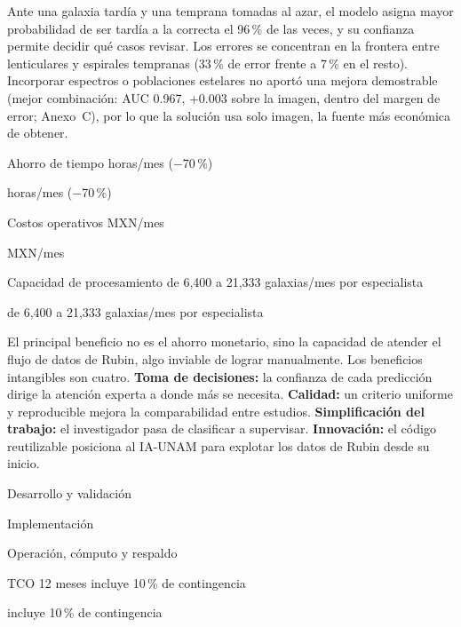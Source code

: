 \documentclass[letterpaper,11pt]{article}
\newcommand{\cifra}[5]{%
  \begingroup\setlength{\fboxsep}{5pt}%
  \colorbox{#1}{\parbox[t]{\dimexpr\linewidth-2\fboxsep\relax}{%
    \setstretch{1}\color{#2}{\Large\bfseries #3}\par
    #4%
    \ifx\relax#5\relax\else\par{\footnotesize #5}\fi}}%
  \endgroup}
\newcommand{\cifragris}[4]{\cifra{black!8}{black}{#1}{#2}{#3}}
\newcommand{\cifraacento}[4]{\cifra{blue!10}{blue!55!black}{#1}{#2}{#3}}
\begin{document}
\noindent Ante una galaxia tardía y una temprana tomadas al azar, el modelo asigna mayor probabilidad de ser tardía a la correcta el 96\,\% de las veces, y su confianza permite decidir qué casos revisar. Los errores se concentran en la frontera entre lenticulares y espirales tempranas (33\,\% de error frente a 7\,\% en el resto). Incorporar espectros o poblaciones estelares no aportó una mejora demostrable (mejor combinación: AUC 0.967, +0.003 sobre la imagen, dentro del margen de error; Anexo~C), por lo que la solución usa solo imagen, la fuente más económica de obtener.

\medskip
\noindent
\begin{minipage}[t]{0.31\linewidth}\cifragris{$-$35\,h}{Ahorro de tiempo}{horas/mes ($-$70\,\%)}{}\end{minipage}\hfill
\begin{minipage}[t]{0.31\linewidth}\cifragris{$-$MXN 8,750}{Costos operativos}{MXN/mes}{}\end{minipage}\hfill
\begin{minipage}[t]{0.31\linewidth}\cifragris{+233\,\%}{Capacidad de procesamiento}{de 6,400 a 21,333 galaxias/mes por especialista}{}\end{minipage}

\smallskip
\noindent{\footnotesize\textcolor{black!60}{Escenario base de 2,000 galaxias/mes y 30\,\% de casos a revisión. Cálculo y supuestos (propios, por confirmar con el IA-UNAM) en el Anexo~A.}}
\medskip

\noindent El principal beneficio no es el ahorro monetario, sino la capacidad de atender el flujo de datos de Rubin, algo inviable de lograr manualmente. Los beneficios intangibles son cuatro. \textbf{Toma de decisiones:} la confianza de cada predicción dirige la atención experta a donde más se necesita. \textbf{Calidad:} un criterio uniforme y reproducible mejora la comparabilidad entre estudios. \textbf{Simplificación del trabajo:} el investigador pasa de clasificar a supervisar. \textbf{Innovación:} el código reutilizable posiciona al IA-UNAM para explotar los datos de Rubin desde su inicio.

\medskip
\noindent
\begin{minipage}[t]{0.235\linewidth}\cifragris{MXN 108,000}{Desarrollo y validación}{}{}\end{minipage}\hfill
\begin{minipage}[t]{0.235\linewidth}\cifragris{MXN 54,000}{Implementación}{}{}\end{minipage}\hfill
\begin{minipage}[t]{0.235\linewidth}\cifragris{MXN 61,200}{Operación, cómputo y respaldo}{}{}\end{minipage}\hfill
\begin{minipage}[t]{0.235\linewidth}\cifraacento{MXN 245,520}{TCO 12 meses}{incluye 10\,\% de contingencia}{}\end{minipage}
\medskip
\end{document}
